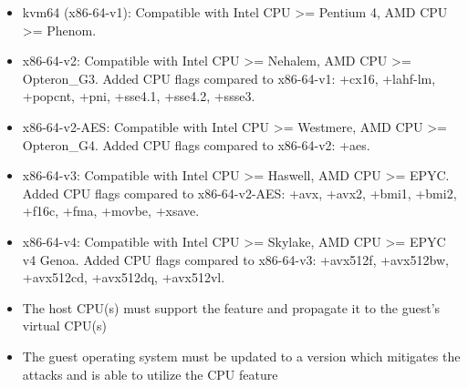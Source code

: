 \begin{itemize}[leftmargin=2cm]

	\item kvm64 (x86-64-v1): Compatible with Intel CPU >= Pentium 4, AMD CPU >= Phenom.

	\item x86-64-v2: Compatible with Intel CPU >= Nehalem, AMD CPU >= Opteron_G3. Added CPU flags compared to x86-64-v1: +cx16, +lahf-lm, +popcnt, +pni, +sse4.1, +sse4.2, +ssse3.

	\item x86-64-v2-AES: Compatible with Intel CPU >= Westmere, AMD CPU >= Opteron_G4. Added CPU flags compared to x86-64-v2: +aes.

	\item x86-64-v3: Compatible with Intel CPU >= Haswell, AMD CPU >= EPYC. Added CPU flags compared to x86-64-v2-AES: +avx, +avx2, +bmi1, +bmi2, +f16c, +fma, +movbe, +xsave.

	\item x86-64-v4: Compatible with Intel CPU >= Skylake, AMD CPU >= EPYC v4 Genoa. Added CPU flags compared to x86-64-v3: +avx512f, +avx512bw, +avx512cd, +avx512dq, +avx512vl.

\end{itemize}

\begin{itemize}[leftmargin=2cm]

	\item The host CPU(s) must support the feature and propagate it to the guest’s virtual CPU(s)

	\item The guest operating system must be updated to a version which mitigates the attacks and is able to utilize the CPU feature

\end{itemize}

